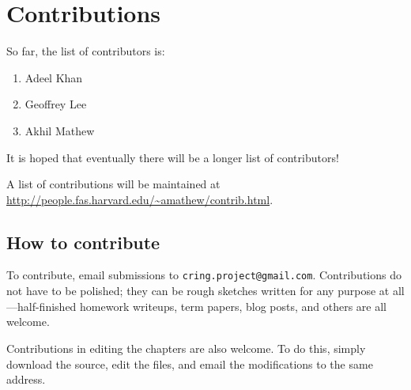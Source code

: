 \chapter*{Contributions}

So far, the list of contributors is:
\begin{enumerate}
\item Adeel Khan 
\item Geoffrey Lee
\item Akhil Mathew
\end{enumerate}

It is hoped that eventually there will be a longer list of contributors!

A list of contributions will be maintained at 
\url{http://people.fas.harvard.edu/~amathew/contrib.html}.

\section*{How to contribute}


To contribute, email submissions to \verb=cring.project@gmail.com=. 
Contributions do not have to be polished; they can be rough sketches written
for any purpose at all---half-finished homework writeups, term papers, blog
posts, and others are all welcome.

Contributions in editing the chapters are also welcome. To do this, simply
download the source, edit the files, and email the modifications to the same
address.


\fancyfoot[C]{\small \textbf{\thepage}}


